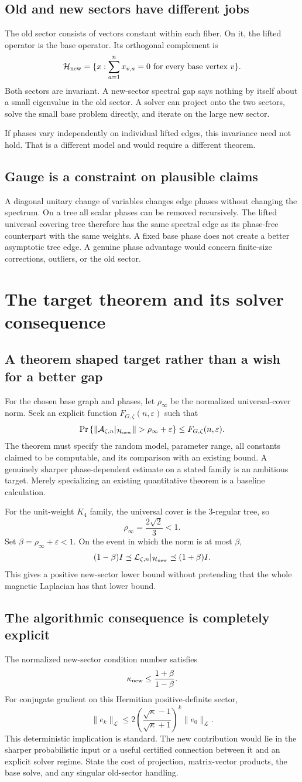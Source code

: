 \documentclass[11pt,letterpaper]{article}
\newcommand{\Page}[1]{\clearpage\section*{#1}}
\newcommand{\Sub}[1]{\subsection*{#1}}
\begin{document}
\Sub{Old and new sectors have different jobs}
The old sector consists of vectors constant within each fiber. On it, the lifted operator is the base operator. Its orthogonal complement is
\[
 \mathcal H_{\rm new}=\{x:\sum_{a=1}^n x_{v,a}=0
                       \text{ for every base vertex }v\}.
\]
Both sectors are invariant. A new-sector spectral gap says nothing by itself about a small eigenvalue in the old sector. A solver can project onto the two sectors, solve the small base problem directly, and iterate on the large new sector.

If phases vary independently on individual lifted edges, this invariance need not hold. That is a different model and would require a different theorem.

\Sub{Gauge is a constraint on plausible claims}
A diagonal unitary change of variables changes edge phases without changing the spectrum. On a tree all scalar phases can be removed recursively. The lifted universal covering tree therefore has the same spectral edge as its phase-free counterpart with the same weights. A fixed base phase does not create a better asymptotic tree edge. A genuine phase advantage would concern finite-size corrections, outliers, or the old sector.

\Page{The target theorem and its solver consequence}

\Sub{A theorem shaped target rather than a wish for a better gap}
For the chosen base graph and phases, let $\rho_\infty$ be the normalized universal-cover norm. Seek an explicit function $F_{G,\zeta}(n,\varepsilon)$ such that
\[
 \Pr\left\{\left\|\mathcal A_{\zeta,n}|_{\mathcal H_{\rm new}}\right\|
       >\rho_\infty+\varepsilon\right\}
 \leq F_{G,\zeta}(n,\varepsilon).
\]
The theorem must specify the random model, parameter range, all constants claimed to be computable, and its comparison with an existing bound. A genuinely sharper phase-dependent estimate on a stated family is an ambitious target. Merely specializing an existing quantitative theorem is a baseline calculation.

For the unit-weight $K_4$ family, the universal cover is the $3$-regular tree, so
\[
 \rho_\infty=\frac{2\sqrt2}{3}<1.
\]
Set $\beta=\rho_\infty+\varepsilon<1$. On the event in which the norm is at most $\beta$,
\[
 (1-\beta)I\preceq\mathcal L_{\zeta,n}|_{\mathcal H_{\rm new}}
        \preceq(1+\beta)I.
\]
This gives a positive new-sector lower bound without pretending that the whole magnetic Laplacian has that lower bound.

\Sub{The algorithmic consequence is completely explicit}
The normalized new-sector condition number satisfies
\[
 \kappa_{\rm new}\leq\frac{1+\beta}{1-\beta}.
\]
For conjugate gradient on this Hermitian positive-definite sector,
\[
 \|e_k\|_{\mathcal L}\leq
 2\left(\frac{\sqrt\kappa-1}{\sqrt\kappa+1}\right)^k
 \|e_0\|_{\mathcal L}.
\]
This deterministic implication is standard. The new contribution would lie in the sharper probabilistic input or a useful certified connection between it and an explicit solver regime. State the cost of projection, matrix-vector products, the base solve, and any singular old-sector handling.
\end{document}
